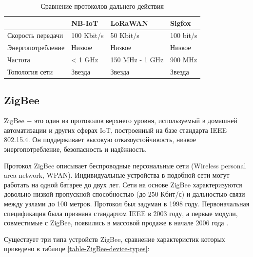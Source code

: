    \begin{table}[h]
   	\centering
   	\caption{Сравнение протоколов дальнего действия}
   	\begin{tabular}{ | l | l | l | l |}
   		\hline
   		& NB-IoT & LoRaWAN & Sigfox \\ \hline
   		Скорость передачи & 100 Kbit/s & 50 Kbit/s & 100 bit/s \\ \hline
   		Энергопотребление & Низкое & Низкое & Низкое \\ \hline
   		Частота & < 1 GHz  & 150 MHz - 1 GHz & 900 MHz \\ \hline
   		Топология сети & Звезда & Звезда & Звезда \\
   		\hline
   	\end{tabular}
   	\label{table-long-range-solutions}
   \end{table}
	

	\subsection{ZigBee}
	ZigBee $-$ это один из протоколов верхнего уровня, используемый в домашней автоматизации и других
	сферах IoT, построенный на базе стандарта IEEE 802.15.4. Он поддерживает высокую отказоустойчивость, 
	низкое энергопотребление, безопасность и надёжность.
	
	Протокол ZigBee описывает беспроводные персональные сети (Wireless personal area network, WPAN).
	Индивидуальные устройства в подобной сети могут работать на одной батарее до двух лет.
	Сети на основе ZigBee характеризуются довольно низкой пропускной способностью (до 250 Кбит/с) и
	дальностью связи между узлами до 100 метров. Протокол был задуман в 1998 году. Первоначальная 
	спецификация была признана стандартом IEEE в 2003 году, а первые модули, совместимые с ZigBee, 
	появились в массовой продаже в начале 2006 года \cite{zigbee-certified-products}.
	
	Существует три типа устройств ZigBee, сравнение характеристик которых приведено в таблице \ref{table-ZigBee-device-types}:
	
